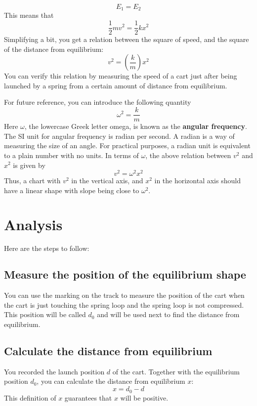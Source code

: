 \begin{equation}
    E_{1} = E_{2}
\end{equation}
This means that
\begin{equation}
    \frac{1}{2} m v^{2} = \frac{1}{2} k x^{2}
\end{equation}
Simplifying a bit, you get a relation between the square of speed, and the square of the distance from equilibrium:
\begin{equation}
    v^{2} = \left( \frac{k}{m} \right) x^{2}
\end{equation}
You can verify this relation by measuring the speed of a cart just after being launched by a spring from a certain amount of distance from equilibrium.

For future reference, you can introduce the following quantity
\begin{equation}
    \omega^{2} = \frac{k}{m}
\end{equation}
Here $\omega$, the lowercase Greek letter omega, is known as the \textbf{angular frequency}. The SI unit for angular frequency is radian per second. A radian is a way of measuring the size of an angle. For practical purposes, a radian unit is equivalent to a plain number with no units. In terms of $\omega$, the above relation between $v^{2}$ and $x^{2}$ is given by
\begin{equation}
    v^{2} = \omega^{2} x^{2}
\end{equation}
Thus, a chart with $v^{2}$ in the vertical axis, and $x^{2}$ in the horizontal axis should have a linear shape with slope being close to $\omega^{2}$.
%
\section{Analysis}
%
Here are the steps to follow:
%
\subsection{Measure the position of the equilibrium shape}
%
You can use the marking on the track to measure the position of the cart when the cart is just touching the spring loop and the spring loop is not compressed. This position will be called $d_{0}$ and will be used next to find the distance from equilibrium.
%
\subsection{Calculate the distance from equilibrium}
%
You recorded the launch position $d$ of the cart. Together with the equilibrium position $d_{0}$, you can calculate the distance from equilibrium $x$:
\begin{equation}
    x = d_{0} - d
\end{equation}
This definition of $x$ guarantees that $x$ will be positive.
%
